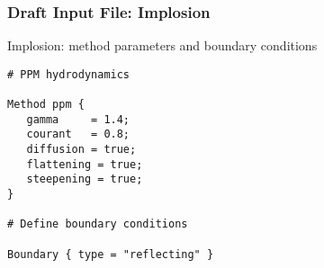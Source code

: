 \begin{frame}[fragile] \frametitle{Draft Input File: Implosion}
\footnotesize
\begin{block}{Implosion: method parameters and boundary conditions}
\begin{verbatim}
# PPM hydrodynamics

Method ppm {
   gamma     = 1.4;
   courant   = 0.8;
   diffusion = true;
   flattening = true;
   steepening = true;
}

# Define boundary conditions

Boundary { type = "reflecting" }
\end{verbatim}
\end{block}
\end{frame}
